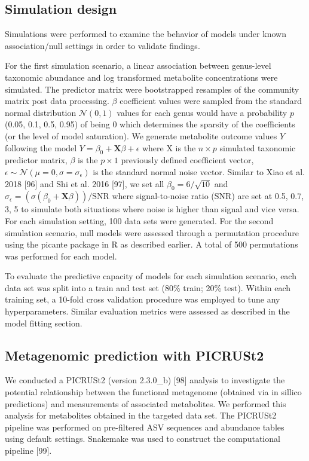 \subsection{Simulation design}
Simulations were performed to examine the behavior of models under known association/null settings in order to validate findings. 

For the first simulation scenario, a linear association between genus-level taxonomic abundance and log transformed metabolite concentrations were simulated. The predictor matrix were bootstrapped resamples of the community matrix post data processing. $\beta$ coefficient values were sampled from the standard normal distribution $\mathcal{N}(0,1)$ values for each genus would have a probability $p$ (0.05, 0.1, 0.5, 0.95) of being 0 which determines the sparsity of the coefficients (or the level of model saturation). We generate metabolite outcome values $Y$ following the model $Y = \beta_0 + \mathbf{X}\beta + \epsilon$
where X is the $n \times p$ simulated taxonomic predictor matrix, $\beta$ is the $p \times 1$ previously defined coefficient vector, $\epsilon  \sim \mathcal{N}(\mu=0,\sigma=\sigma_\epsilon )$ is the standard normal noise vector. Similar to Xiao et al. 2018 [96] and Shi et al. 2016 [97], we set all $\beta_0 = 6/\sqrt{10}$ and $\sigma_\epsilon=(\sigma(\beta_0+\mathbf{X}\beta))/\text{SNR}$ where signal-to-noise ratio (SNR) are set at 0.5, 0.7, 3, 5 to simulate both situations where noise is higher than signal and vice versa. For each simulation setting, 100 data sets were generated. 
For the second simulation scenario, null models were assessed through a permutation procedure using the picante package in R as described earlier. A total of 500 permutations was performed for each model. 

To evaluate the predictive capacity of models for each simulation scenario, each data set was split into a train and test set (80\% train; 20\% test). Within each training set, a 10-fold cross validation procedure was employed to tune any hyperparameters. Similar evaluation metrics were assessed as described in the model fitting section. 

\subsection{Metagenomic prediction with PICRUSt2}
We conducted a PICRUSt2 (version 2.3.0\_b) [98] analysis to investigate the potential relationship between the functional metagenome (obtained via in sillico predictions) and measurements of associated metabolites. We performed this analysis for metabolites obtained in the targeted data set. The PICRUSt2 pipeline was performed on pre-filtered ASV sequences and abundance tables using default settings. Snakemake was used to construct the computational pipeline [99].  

